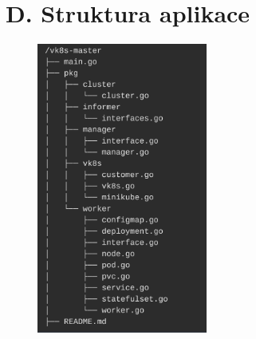 \section*{D. Struktura aplikace\label{app:struktura}}
\begin{figure}[H]
    
	  \includegraphics[width=0.5\textwidth]{images/vk8s-master.png}
\end{figure}
%
